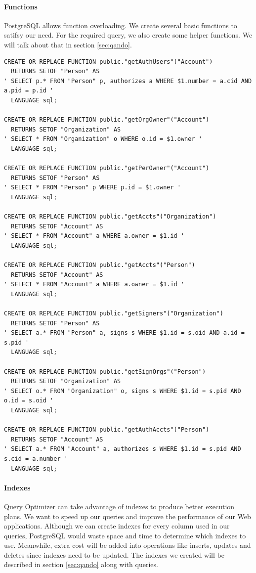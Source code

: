 \documentclass[11pt]{article}
\begin{document}
\paragraph{Functions} PostgreSQL allows function overloading. We create several basic functions to satifsy our need. For the required query, we also create some helper functions. We will talk about that in section \ref{sec:qando}.
\label{sec:functions}
\begin{verbatim}
CREATE OR REPLACE FUNCTION public."getAuthUsers"("Account")
  RETURNS SETOF "Person" AS
' SELECT p.* FROM "Person" p, authorizes a WHERE $1.number = a.cid AND a.pid = p.id '
  LANGUAGE sql;

CREATE OR REPLACE FUNCTION public."getOrgOwner"("Account")
  RETURNS SETOF "Organization" AS
' SELECT * FROM "Organization" o WHERE o.id = $1.owner '
  LANGUAGE sql;

CREATE OR REPLACE FUNCTION public."getPerOwner"("Account")
  RETURNS SETOF "Person" AS
' SELECT * FROM "Person" p WHERE p.id = $1.owner '
  LANGUAGE sql;

CREATE OR REPLACE FUNCTION public."getAccts"("Organization")
  RETURNS SETOF "Account" AS
' SELECT * FROM "Account" a WHERE a.owner = $1.id '
  LANGUAGE sql;

CREATE OR REPLACE FUNCTION public."getAccts"("Person")
  RETURNS SETOF "Account" AS
' SELECT * FROM "Account" a WHERE a.owner = $1.id '
  LANGUAGE sql;

CREATE OR REPLACE FUNCTION public."getSigners"("Organization")
  RETURNS SETOF "Person" AS
' SELECT a.* FROM "Person" a, signs s WHERE $1.id = s.oid AND a.id = s.pid '
  LANGUAGE sql;

CREATE OR REPLACE FUNCTION public."getSignOrgs"("Person")
  RETURNS SETOF "Organization" AS
' SELECT o.* FROM "Organization" o, signs s WHERE $1.id = s.pid AND o.id = s.oid '
  LANGUAGE sql;

CREATE OR REPLACE FUNCTION public."getAuthAccts"("Person")
  RETURNS SETOF "Account" AS
' SELECT a.* FROM "Account" a, authorizes s WHERE $1.id = s.pid AND s.cid = a.number '
  LANGUAGE sql;
\end{verbatim}

\paragraph{Indexes} Query Optimizer can take advantage of indexes to produce better execution plans. We want to speed up our queries and improve the performance of our Web applications. Although we can create indexes for every column used in our queries, PostgreSQL would waste space and time to determine which indexes to use. Meanwhile, extra cost will be added into operations like inserts, updates and deletes since indexes need to be updated. The indexes we created will be described in section \ref{sec:qando} along with queries.
\end{document}
